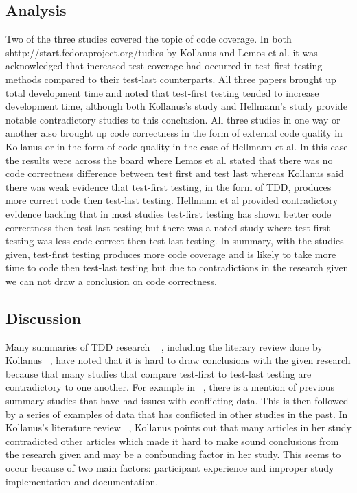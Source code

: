 \documentclass{sig-alternate}
\begin{document}
\subsection{Analysis}
Two of the three studies covered the topic of code coverage.  In both shttp://start.fedoraproject.org/tudies by Kollanus and Lemos et al. it was acknowledged that increased test coverage had occurred in test-first testing methods compared to their test-last counterparts.  All three papers brought up total development time and noted that test-first testing tended to increase development time, although both Kollanus’s study and Hellmann’s study provide notable contradictory studies to this conclusion.   All three studies in one way or another also brought up code correctness in the form of external code quality in Kollanus or in the form of code quality in the case of Hellmann et al.  In this case the results were across the board where Lemos et al. stated that there was no code correctness difference between test first and test last whereas Kollanus said there was weak evidence that test-first testing, in the form of TDD, produces more correct code then test-last testing.  Hellmann et al provided contradictory evidence backing that in most studies test-first testing has shown better code correctness then test last testing but there was a noted study where test-first testing was less code correct then test-last testing.   In summary, with the studies given, test-first testing produces more code coverage and is likely to take more time to code then test-last testing but due to contradictions in the research given we can not draw a conclusion on code correctness.

\subsection{Discussion}
Many summaries of TDD research ~\cite{Hammond:2012, Hellman:2012, Kettunen:2010} , including the literary review done by Kollanus ~\cite{Kollanus:2010}, have noted that it is hard to draw conclusions with the given research because that many studies that compare test-first to test-last testing are contradictory to one another.  For example in ~\cite{Hellman:2012},  there is a mention of previous summary studies that have had issues with conflicting data.  This is then followed by a series of examples of data that has conflicted in other studies in the past.  In Kollanus’s literature review ~\cite{Kollanus:2010}, Kollanus points out that many articles in her study contradicted other articles which made it hard to make sound conclusions from the research given and may be a confounding factor in her study.  This seems to occur because of two main factors: participant experience and improper study implementation and documentation.
\end{document}
